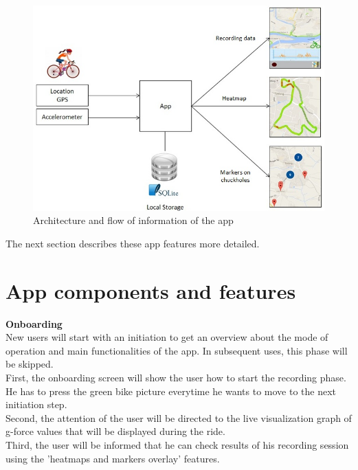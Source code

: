 \documentclass[10pt,a4paper]{article} %
\begin{document}
	\begin{figure}[H]
	\centering
    	\includegraphics[scale = 0.8]{pic1}
    	\caption{Architecture and flow of information of the app }
	\label{fig:arch_flow}
    	\end{figure}
    
	\noindent
	The next section describes these app features more detailed.
    
    \section{App components and features}
    
    
    \textbf{Onboarding}\\
    New users will start with an initiation to get an overview about the mode of operation and main functionalities of the app. In subsequent uses, this phase will be skipped.\\
    First, the onboarding screen will show the user how to start the recording phase. He has to press the green bike picture everytime he wants to move to the next initiation step. \\
    Second, the attention of the user will be directed to the live visualization graph of g-force values that will be displayed during the ride.\\
    Third, the user will be informed that he can check results of his recording session using the 'heatmaps and markers overlay' features.
    
\end{document}
